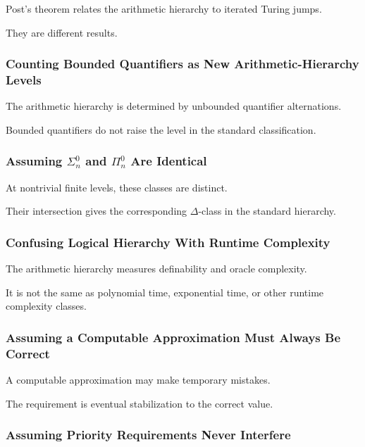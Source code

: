 Post's theorem relates the arithmetic hierarchy to iterated Turing jumps.

They are different results.

\subsubsection{Counting Bounded Quantifiers as New Arithmetic-Hierarchy Levels}

The arithmetic hierarchy is determined by unbounded quantifier
alternations.

Bounded quantifiers do not raise the level in the standard classification.

\subsubsection{Assuming \(\Sigma^0_n\) and \(\Pi^0_n\) Are Identical}

At nontrivial finite levels, these classes are distinct.

Their intersection gives the corresponding \(\Delta\)-class in the standard
hierarchy.

\subsubsection{Confusing Logical Hierarchy With Runtime Complexity}

The arithmetic hierarchy measures definability and oracle complexity.

It is not the same as polynomial time, exponential time, or other runtime
complexity classes.

\subsubsection{Assuming a Computable Approximation Must Always Be Correct}

A computable approximation may make temporary mistakes.

The requirement is eventual stabilization to the correct value.

\subsubsection{Assuming Priority Requirements Never Interfere}

